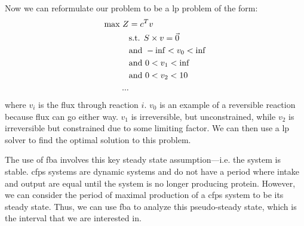 Now we can reformulate our problem to be a \gls{lp} problem of the form:
\begin{equation}
\centering
\begin{split}
\text{max } Z &= c^Tv \\
&\text{s.t. } S \times v = \vec{0} \\
&\text{and } -\inf < v_0 < \inf \\
&\text{and } 0 < v_1 < \inf \\
&\text{and } 0 < v_2 < 10 \\
...
\end{split}
\end{equation}
where $v_i$ is the flux through reaction $i$.
$v_0$ is an example of a reversible reaction because flux can go either way.
$v_1$ is irreversible, but unconstrained, while $v_2$ is irreversible but constrained due to some limiting factor.
We can then use a \gls{lp} solver to find the optimal solution to this problem.

The use of \gls{fba} involves this key steady state assumption---i.e. the system is stable.
\gls{cfps} systems are dynamic systems and do not have a period where intake and output are equal until the system is no longer producing protein.
However, we can consider the period of maximal production of a \gls{cfps} system to be its steady state.
Thus, we can use \gls{fba} to analyze this pseudo-steady state, which is the interval that we are interested in.


